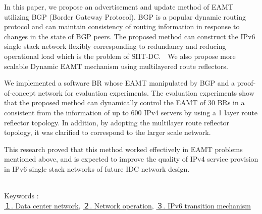 In this paper, we propose an advertisement and update method of EAMT utilizing BGP (Border Gateway Protocol). BGP is a popular dynamic routing protocol and can maintain consistency of routing information in response to changes in the state of BGP peers.
The proposed method can construct the IPv6 single stack network flexibly corresponding to redundancy and reducing operational load which is the problem of SIIT-DC.　We also propose more scalable Dynamic EAMT mechanism using multilayered route reflectors.


We implemented a software BR whose EAMT manipulated by BGP and a proof-of-concept network for evaluation experiments. 
The evaluation experiments show that the proposed method can dynamically control the EAMT of 30 BRs in a consistent from the information of up to 600 IPv4 servers by using a 1 layer route reflector topology. In addition, by adopting the multilayer route reflector topology, it was clarified to correspond to the larger scale network.

This research proved that this method worked effectively in EAMT problems mentioned above, and is expected to improve the quality of IPv4 service provision in IPv6 single stack networks of future IDC network design.

~\\ 

Keywords : \\
\underline{１. Data center network},
\underline{２. Network operation},
\underline{３. IPv6 transition mechanism}
\begin{flushright}
\edept \\
\eauthor
\end{flushright}
